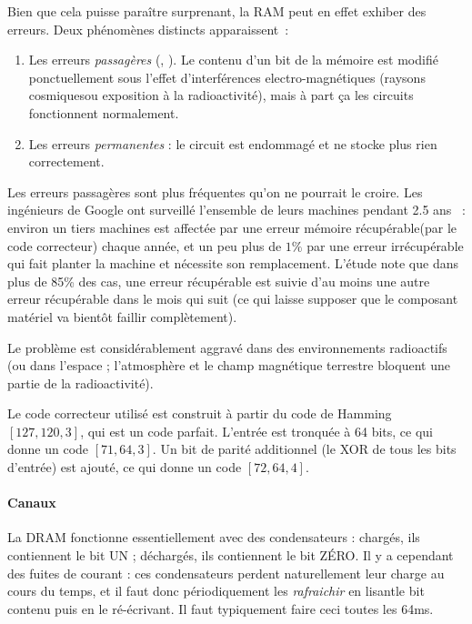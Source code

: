 \begin{danger}
  Bien que cela puisse paraître surprenant, la RAM peut en effet exhiber des
  erreurs. Deux phénomènes distincts apparaissent~:
  \begin{enumerate}
  \item Les erreurs \emph{passagères} (, ). Le contenu d'un bit de la mémoire est modifié ponctuellement sous
    l'effet d'interférences electro-magnétiques (\og raysons cosmiques\fg ou
    exposition à la radioactivité), mais à part ça les circuits fonctionnent
    normalement.
    
  \item Les erreurs \emph{permanentes} : le circuit est endommagé et ne stocke
    plus rien correctement.
  \end{enumerate}
  
  Les erreurs passagères sont plus fréquentes qu'on ne pourrait le croire. Les
  ingénieurs de \textsf{Google} ont surveillé l'ensemble de leurs machines
  pendant 2.5 ans~\cite{DRAM-errors-google} : environ un tiers machines est
  affectée par une \og erreur mémoire récupérable\fg (par le code correcteur)
  chaque année, et un peu plus de $1\%$ par une erreur irrécupérable qui fait
  planter la machine et nécessite son remplacement. L'étude note que dans plus
  de 85\% des cas, une erreur récupérable est suivie d'au moins une autre erreur
  récupérable dans le mois qui suit (ce qui laisse supposer que le composant
  matériel va bientôt faillir complètement).

  Le problème est considérablement aggravé dans des environnements radioactifs
  (ou dans l'espace ; l'atmosphère et le champ magnétique terrestre bloquent une
  partie de la radioactivité).
\end{danger}

\begin{ddanger}
  Le code correcteur utilisé est construit à partir du code de Hamming
  $[127, 120, 3]$, qui est un code parfait. L'entrée est tronquée à 64 bits, ce
  qui donne un code $[71, 64, 3]$. Un bit de parité additionnel (le XOR de tous
  les bits d'entrée) est ajouté, ce qui donne un code $[72, 64, 4]$.
\end{ddanger}


\paragraph{Canaux} La DRAM fonctionne essentiellement avec des condensateurs : chargés, ils
contiennent le bit UN ; déchargés, ils contiennent le bit ZÉRO. Il y a cependant
des fuites de courant : ces condensateurs perdent naturellement leur charge au
cours du temps, et il faut donc périodiquement les \emph{rafraichir} en \og
lisant\fg le bit contenu puis en le \og ré-écrivant\fg. Il faut typiquement
faire ceci toutes les 64ms.

